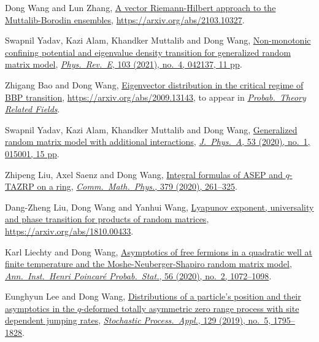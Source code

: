\begin{etaremune}
\item
  Dong Wang and Lun Zhang, \href{https://arxiv.org/abs/2103.10327}{A vector Riemann-Hilbert approach to the Muttalib-Borodin ensembles}, \url{https://arxiv.org/abs/2103.10327}.
\item
  Swapnil Yadav, Kazi Alam, Khandker Muttalib and Dong Wang, \href{https://arxiv.org/abs/2010.08856}{Non-monotonic confining potential and eigenvalue density transition for generalized random matrix model}, \href{https://doi.org/10.1103/PhysRevE.103.042137}{\textit{Phys.\ Rev.\ E}, 103 (2021), no.\ 4, 042137, 11 pp}.
\item
  Zhigang Bao and Dong Wang, \href{https://arxiv.org/abs/2009.13143}{Eigenvector distribution in the critical regime of BBP transition}, \url{https://arxiv.org/abs/2009.13143}, to appear in \href{https://doi.org/10.1007/s00440-021-01062-4}{\textit{Probab.\ Theory  Related Fields}}.
\item
  Swapnil Yadav, Kazi Alam, Khandker Muttalib and Dong Wang, \href{https://arxiv.org/abs/1908.03726}{Generalized random matrix model with additional interactions}, \href{https://dx.doi.org/10.1088/1751-8121/ab56e0}{\textit{J.\ Phys.\ A}, 53 (2020), no.\ 1, 015001, 15 pp}.
\item
  Zhipeng Liu, Axel Saenz and Dong Wang, \href{https://arxiv.org/abs/1905.02987}{Integral formulas of ASEP and $q$-TAZRP on a ring}, \href{https://doi.org/10.1007/s00220-020-03837-7}{\textit{Comm.\ Math.\ Phys.}, 379 (2020), 261--325}.
\item
  Dang-Zheng Liu, Dong Wang and Yanhui Wang, \href{https://arxiv.org/abs/1810.00433}{Lyapunov exponent, universality and phase transition for products of random matrices}, \url{https://arxiv.org/abs/1810.00433}.
\item
  Karl Liechty and Dong Wang, \href{https://arxiv.org/abs/1706.06653}{Asymptotics of free fermions in a quadratic well at finite temperature and the Moshe-Neuberger-Shapiro random matrix model}, \href{https://doi.org/10.1214/19-AIHP994}{\textit{Ann.\ Inst.\ Henri Poincar\'{e} Probab.\ Stat.}, 56 (2020), no.\ 2, 1072--1098}.
\item
  Eunghyun Lee and Dong Wang, \href{https://arxiv.org/abs/1703.08839}{Distributions of a particle's position and their asymptotics in the $q$-deformed totally asymmetric zero range process with site dependent jumping rates}, \href{https://doi.org/10.1016/j.spa.2018.06.005}{\textit{Stochastic Process.\ Appl.}, 129 (2019), no.\ 5, 1795--1828}.
\item

\end{etaremune}
